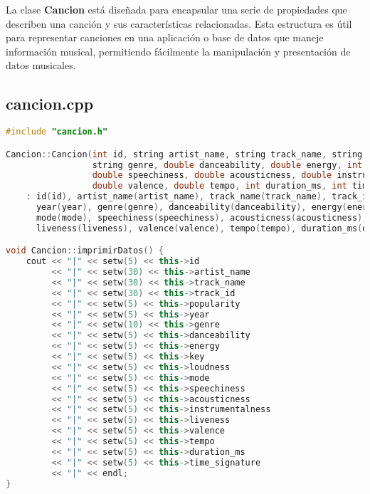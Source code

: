 \documentclass[12pt]{article}
\begin{document}
\begin{flushleft}
            \noindent\hspace*{4em}La clase \textbf{Cancion} está diseñada para encapsular una serie de propiedades que describen una canción y sus características relacionadas. Esta estructura es útil para representar canciones en una aplicación o base de datos que maneje información musical, permitiendo fácilmente la manipulación y presentación de datos musicales.
            \subsection{cancion.cpp}
            \begin{lstlisting}[language=C++, style=mystyle, caption={Código de un Clase Canción}]
#include "cancion.h"

Cancion::Cancion(int id, string artist_name, string track_name, string track_id, int popularity, int year,
                 string genre, double danceability, double energy, int key, double loudness, int mode,
                 double speechiness, double acousticness, double instrumentalness, double liveness,
                 double valence, double tempo, int duration_ms, int time_signature)
    : id(id), artist_name(artist_name), track_name(track_name), track_id(track_id), popularity(popularity),
      year(year), genre(genre), danceability(danceability), energy(energy), key(key), loudness(loudness),
      mode(mode), speechiness(speechiness), acousticness(acousticness), instrumentalness(instrumentalness),
      liveness(liveness), valence(valence), tempo(tempo), duration_ms(duration_ms), time_signature(time_signature) {}

void Cancion::imprimirDatos() {
    cout << "|" << setw(5) << this->id
         << "|" << setw(30) << this->artist_name
         << "|" << setw(30) << this->track_name
         << "|" << setw(30) << this->track_id
         << "|" << setw(5) << this->popularity
         << "|" << setw(5) << this->year
         << "|" << setw(10) << this->genre
         << "|" << setw(5) << this->danceability
         << "|" << setw(5) << this->energy
         << "|" << setw(5) << this->key
         << "|" << setw(5) << this->loudness
         << "|" << setw(5) << this->mode
         << "|" << setw(5) << this->speechiness
         << "|" << setw(5) << this->acousticness
         << "|" << setw(5) << this->instrumentalness
         << "|" << setw(5) << this->liveness
         << "|" << setw(5) << this->valence
         << "|" << setw(5) << this->tempo
         << "|" << setw(5) << this->duration_ms
         << "|" << setw(5) << this->time_signature
         << "|" << endl;
}


\end{lstlisting}
\end{flushleft}
\end{document}

